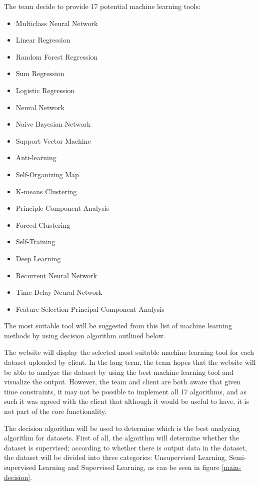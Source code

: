 \documentclass[a4paper,titlepage]{article}
\begin{document}
The team decide to provide 17 potential machine learning tools:
\begin{multicols}{2}
\begin{itemize}
  \item Multiclass Neural Network
  \item Linear Regression
  \item Random Forest Regression
  \item Sum Regression
  \item Logistic Regression
  \item Neural Network
  \item Naive Bayesian Network
  \item Support Vector Machine
  \item Anti-learning
  \item Self-Organizing Map
  \item K-means Clustering
  \item Principle Component Analysis
  \item Forced Clustering
  \item Self-Training
  \item Deep Learning
  \item Recurrent Neural Network
  \item Time Delay Neural Network
  \item Feature Selection Principal Component Analysis
\end{itemize}
\end{multicols}

The most suitable tool will be suggested from this list of machine learning methods by using decision algorithm outlined below.

The website will display the selected most suitable machine learning tool for each dataset uploaded by client.
In the long term, the team hopes that the website will be able to analyze the dataset by using the best machine learning tool and visualize the output.
However, the team and client are both aware that given time constraints, it may not be possible to implement all 17 algorithms, and as such it was agreed with the client that although it would be useful to have, it is not part of the core functionality.

The decision algorithm will be used to determine which is the best analyzing algorithm for datasets.
First of all, the algorithm will determine whether the dataset is supervised; according to whether there is output data in the dataset, the dataset will be divided into three categories: Unsupervised Learning, Semi-supervised Learning and Supervised Learning, as can be seen in figure \ref{main-decision}.
\end{document}
